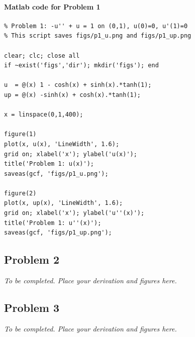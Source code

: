 \documentclass[12pt, a4paper]{article}
\begin{document}
\paragraph{Matlab code for Problem 1}
\begin{verbatim}
% Problem 1: -u'' + u = 1 on (0,1), u(0)=0, u'(1)=0
% This script saves figs/p1_u.png and figs/p1_up.png

clear; clc; close all
if ~exist('figs','dir'); mkdir('figs'); end

u  = @(x) 1 - cosh(x) + sinh(x).*tanh(1);
up = @(x) -sinh(x) + cosh(x).*tanh(1);

x = linspace(0,1,400);

figure(1)
plot(x, u(x), 'LineWidth', 1.6);
grid on; xlabel('x'); ylabel('u(x)');
title('Problem 1: u(x)');
saveas(gcf, 'figs/p1_u.png');

figure(2)
plot(x, up(x), 'LineWidth', 1.6);
grid on; xlabel('x'); ylabel('u''(x)');
title('Problem 1: u''(x)');
saveas(gcf, 'figs/p1_up.png');
\end{verbatim}

\newpage
\subsection*{Problem 2}
\textit{To be completed. Place your derivation and figures here.}

\subsection*{Problem 3}
\textit{To be completed. Place your derivation and figures here.}

\newpage
\printbibliography
\end{document}
